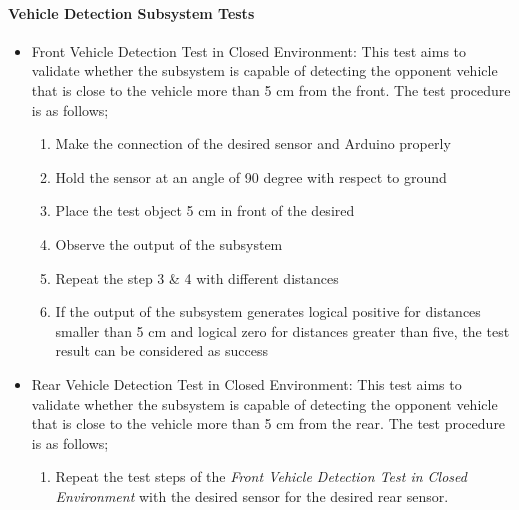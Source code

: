 \documentclass[a4paper,12pt]{article}
\begin{document}
		
	
	\paragraph{Vehicle Detection Subsystem Tests}\label{sect:vhd}
		
		\begin{itemize}
		
		\item Front Vehicle Detection Test in Closed Environment:
			This test aims to validate whether the subsystem is capable of detecting the opponent vehicle that is close to the vehicle more than 5 cm from the front. The test procedure is as follows; 		
			
			\begin{enumerate}
				\item Make the connection of the desired sensor and Arduino properly \vspace{-0.2cm}
				\item Hold the sensor at an angle of 90 degree with respect to ground \vspace{-0.2cm}
				\item Place the test object 5 cm in front of the desired \vspace{-0.2cm}
				\item Observe the output of the subsystem \vspace{-0.2cm}
				\item Repeat the step 3 \& 4 with different distances \vspace{-0.2cm}
				\item If the output of the subsystem generates logical positive for distances smaller than 5 cm and logical zero for distances greater than five, the test result can be considered as success \vspace{-0.2cm}
			\end{enumerate}					
		
		\item Rear Vehicle Detection Test in Closed Environment:
			This test aims to validate whether the subsystem is capable of detecting the opponent vehicle that is close to the vehicle more than 5 cm from the rear. The test procedure is as follows; 		
			\begin{enumerate}
				\item Repeat the test steps of the \textit{Front Vehicle Detection Test in Closed Environment} with the desired sensor for the desired rear sensor.  \vspace{-0.2cm}
			\end{enumerate}
		

\end{itemize}
\end{document}
